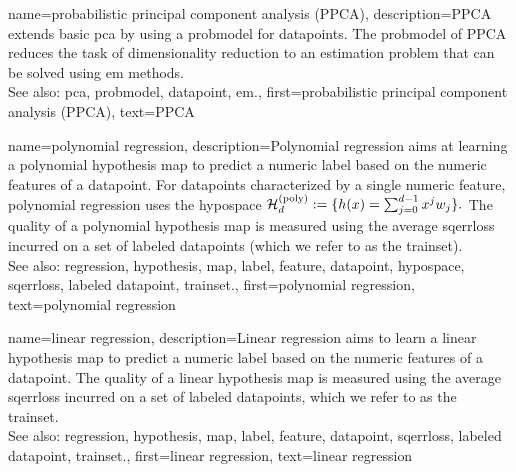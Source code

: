 {name={probabilistic principal component analysis (PPCA)}, 
	description={PPCA 
		extends basic \gls{pca} by using a \gls{probmodel} for \glspl{datapoint}. The \gls{probmodel} of PPCA 
		reduces the task of dimensionality reduction to an estimation problem that can be solved using \gls{em} 
		methods.
				\\
		See also: \gls{pca}, \gls{probmodel}, \gls{datapoint}, \gls{em}.},
	first={probabilistic principal component analysis (PPCA)},
	text={PPCA}
}
	
{name={polynomial regression}, 
	description={Polynomial 
		\gls{regression} aims at learning a polynomial \gls{hypothesis} \gls{map} to predict a numeric \gls{label} based
		 on the numeric \glspl{feature} of a \gls{datapoint}. For \glspl{datapoint} characterized by a single 
		 numeric \gls{feature}, polynomial \gls{regression} uses the \gls{hypospace} 
		$\mathcal{H}^{(\rm poly)}_{d} := \{ h(x) = \sum_{j=0}^{d-1} x^{j} w_{j} \}.$
		The quality of a polynomial \gls{hypothesis} \gls{map} is measured using the average \gls{sqerrloss} 
		incurred on a set of \glspl{labeled datapoint} (which we refer to as the 
		\gls{trainset}).
					\\
		See also: \gls{regression}, \gls{hypothesis}, \gls{map}, \gls{label}, \gls{feature}, \gls{datapoint}, \gls{hypospace}, \gls{sqerrloss}, \gls{labeled datapoint}, \gls{trainset}.},
	first={polynomial regression},
	text={polynomial regression}
}

{name={linear regression}, 
	description={Linear 
		\gls{regression} aims to learn a linear \gls{hypothesis} \gls{map} to predict a numeric \gls{label} based 
		on the numeric \glspl{feature} of a \gls{datapoint}. The quality of a linear \gls{hypothesis} \gls{map} is 
		measured using the average \gls{sqerrloss} incurred on a set of \glspl{labeled datapoint}, 
		which we refer to as the \gls{trainset}.
				\\
		See also: \gls{regression}, \gls{hypothesis}, \gls{map}, \gls{label}, \gls{feature}, \gls{datapoint},  \gls{sqerrloss}, \gls{labeled datapoint}, \gls{trainset}.},
	first={linear regression},
	text={linear regression}
}
        
